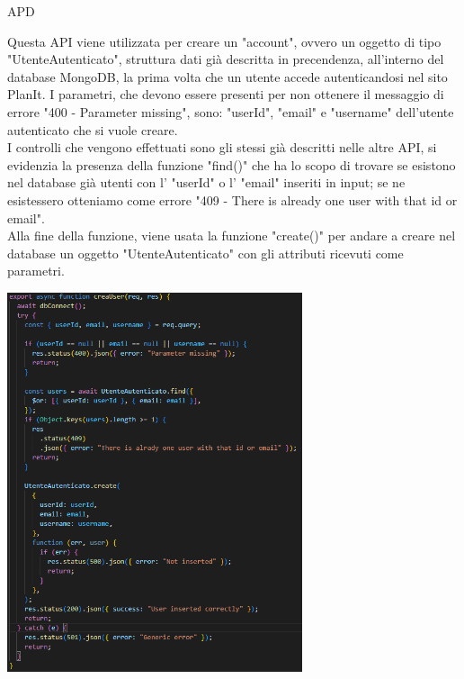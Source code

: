 \begin{listaPersonale} {APD}
\begin{listaPersonale2}[APD]{}
\begin{center}
                \end{center}
                \newpage
                Questa API viene utilizzata per creare un "account", ovvero un oggetto di tipo "UtenteAutenticato", struttura dati già descritta in precendenza, all'interno del database MongoDB, la prima volta che un utente accede autenticandosi nel sito PlanIt. I parametri, che devono essere presenti per non ottenere il messaggio di errore "400 - Parameter missing", sono: "userId", "email" e "username" dell'utente autenticato che si vuole creare. \\
                I controlli che vengono effettuati sono gli stessi già descritti nelle altre API, si evidenzia la presenza della funzione "find()" che ha lo scopo di trovare se esistono nel database già utenti con l' "userId" o l' "email" inseriti in input; se ne esistessero otteniamo come errore "409 - There is already one user with that id or email". \\
                Alla fine della funzione, viene usata la funzione "create()" per andare a creare nel database un oggetto "UtenteAutenticato" con gli attributi ricevuti come parametri.
                \begin{center}
                    \includegraphics[width=0.65\textwidth, height=0.55\textheight]{img/png/APIs/creaUser.png}

\end{center}
\end{listaPersonale2}
\end{listaPersonale}
